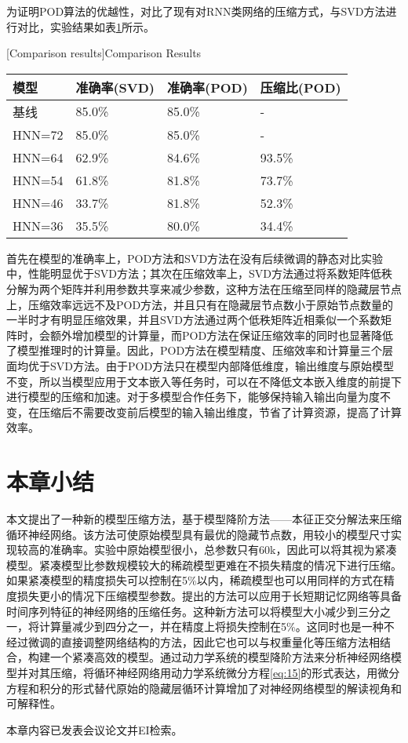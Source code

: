 为证明POD算法的优越性，对比了现有对RNN类网络的压缩方式，与SVD\cite{xue2013restructuring}方法进行对比，实验结果如表\ref{tab:method-comparison}所示。
\begin{table}[htb]
  \centering
  \begin{minipage}[t]{0.8\linewidth}
    [Comparison results]{Comparison Results}
    \label{tab:method-comparison}
    \begin{tabularx}{\linewidth}{lXXX}
      \toprule[1.5pt]
      {模型} & {准确率(SVD)} & {准确率(POD)} & {压缩比(POD)} \\\midrule[1pt]
      基线 & 85.0\% & 85.0\% & - \\
      HNN=72 & 85.0\% & 85.0\% & - \\
      HNN=64 & 62.9\% & 84.6\% & 93.5\% \\
      HNN=54 & 61.8\% & 81.8\% & 73.7\% \\
      HNN=46 & 33.7\% & 81.8\% & 52.3\% \\
      HNN=36 & 35.5\% & 80.0\% & 34.4\% \\
      \bottomrule[1.5pt]
    \end{tabularx}
  \end{minipage}
\end{table}

首先在模型的准确率上，POD方法和SVD方法在没有后续微调的静态对比实验中，性能明显优于SVD方法；其次在压缩效率上，SVD方法通过将系数矩阵低秩分解为两个矩阵并利用参数共享来减少参数，这种方法在压缩至同样的隐藏层节点上，压缩效率远远不及POD方法，并且只有在隐藏层节点数小于原始节点数量的一半时才有明显压缩效果，并且SVD方法通过两个低秩矩阵近相乘似一个系数矩阵时，会额外增加模型的计算量，而POD方法在保证压缩效率的同时也显著降低了模型推理时的计算量。因此，POD方法在模型精度、压缩效率和计算量三个层面均优于SVD方法。由于POD方法只在模型内部降低维度，输出维度与原始模型不变，所以当模型应用于文本嵌入等任务时，可以在不降低文本嵌入维度的前提下进行模型的压缩和加速。对于多模型合作任务下，能够保持输入输出向量为度不变，在压缩后不需要改变前后模型的输入输出维度，节省了计算资源，提高了计算效率。
\section{本章小结}
本文提出了一种新的模型压缩方法，基于模型降阶方法——本征正交分解法来压缩循环神经网络。该方法可使原始模型具有最优的隐藏节点数，用较小的模型尺寸实现较高的准确率。实验中原始模型很小，总参数只有60k，因此可以将其视为紧凑模型。紧凑模型比参数规模较大的稀疏模型更难在不损失精度的情况下进行压缩。如果紧凑模型的精度损失可以控制在5\%以内，稀疏模型也可以用同样的方式在精度损失更小的情况下压缩模型参数。提出的方法可以应用于长短期记忆网络等具备时间序列特征的神经网络的压缩任务。这种新方法可以将模型大小减少到三分之一，将计算量减少到四分之一，并在精度上将损失控制在5\%。这同时也是一种不经过微调的直接调整网络结构的方法，因此它也可以与权重量化等压缩方法相结合，构建一个紧凑高效的模型。通过动力学系统的模型降阶方法来分析神经网络模型并对其压缩，将循环神经网络用动力学系统微分方程\ref{eq:15}的形式表达，用微分方程和积分的形式替代原始的隐藏层循环计算增加了对神经网络模型的解读视角和可解释性。

本章内容已发表会议论文并EI检索。
